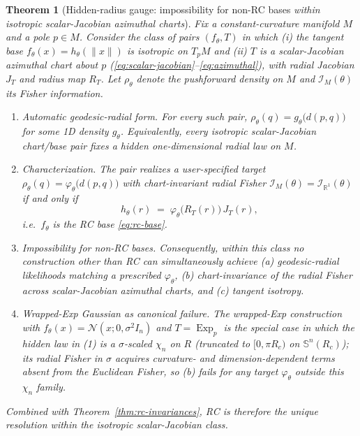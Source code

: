 \documentclass{article}
\newtheorem{theorem}{Theorem}
\theoremstyle{definition}
\theoremstyle{remark}
\newcommand{\SSS}{\mathbb{S}}
\newcommand{\Exp}{\operatorname{Exp}}
\begin{document}
\begin{theorem}[Hidden-radius gauge: impossibility for non-RC bases \emph{within isotropic scalar-Jacobian azimuthal charts}]
\label{thm:hidden-radius-gauge}
Fix a constant-curvature manifold $M$ and a pole $p\in M$. Consider the class of pairs
$(f_\theta, T)$ in which (i) the tangent base $f_\theta(x)=h_\theta(\|x\|)$ is isotropic
on $T_pM$ and (ii) $T$ is a scalar-Jacobian azimuthal chart about $p$
(\eqref{eq:scalar-jacobian}--\eqref{eq:azimuthal}), with radial Jacobian $J_T$ and
radius map $R_T$. Let $\rho_\theta$ denote the pushforward density on $M$ and
$\mathcal{I}_M(\theta)$ its Fisher information.
\begin{enumerate}
  \item \emph{Automatic geodesic-radial form.} For every such pair, $\rho_\theta(q)=g_\theta\!\bigl(d(p,q)\bigr)$
        for some 1D density $g_\theta$. Equivalently, every isotropic scalar-Jacobian chart/base pair
        fixes a \emph{hidden} one-dimensional radial law on $M$.
  \item \emph{Characterization.} The pair realizes a user-specified target
        $\rho_\theta(q)=\varphi_\theta\!\bigl(d(p,q)\bigr)$ with chart-invariant radial Fisher
        $\mathcal{I}_M(\theta)=\mathcal{I}_{\mathbb{R}^1}(\theta)$
        \emph{if and only if}
        \[
          h_\theta(r)\;=\;\varphi_\theta\!\bigl(R_T(r)\bigr)\,J_T(r),
        \]
        i.e.\ $f_\theta$ is the RC base \eqref{eq:rc-base}.
  \item \emph{Impossibility for non-RC bases.} Consequently, within this class no construction other
        than RC can simultaneously achieve (a) geodesic-radial likelihoods matching a prescribed
        $\varphi_\theta$, (b) chart-invariance of the radial Fisher across scalar-Jacobian azimuthal
        charts, and (c) tangent isotropy.
  \item \emph{Wrapped-Exp Gaussian as canonical failure.} The wrapped-Exp construction with
        $f_\theta(x)=\mathcal{N}(x;0,\sigma^2 I_n)$ and $T=\Exp_p$ is the special case in which the
        hidden law in (1) is a $\sigma$-scaled $\chi_n$ on $R$ (truncated to $[0,\pi R_c)$ on
        $\SSS^n(R_c)$); its radial Fisher in $\sigma$ acquires curvature- and
        dimension-dependent terms absent from the Euclidean Fisher, so (b) fails for any target
        $\varphi_\theta$ outside this $\chi_n$ family.
\end{enumerate}
Combined with Theorem~\ref{thm:rc-invariances}, RC is therefore the unique resolution within
the isotropic scalar-Jacobian class.
\end{theorem}
\end{document}

